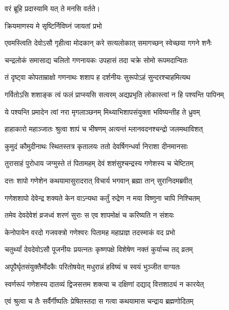 
{वरं ब्रूहि प्रदास्यामि यत् ते मनसि वर्तते।}

\onelineshloka
{क्रियमाणस्य मे सृष्टिर्निविघ्नं जायतां प्रभो}%

\twolineshloka
{एवमस्त्विति देवोऽसौ गृहीत्वा मोदकान् करे}
{सत्यलोकात् समागच्छन् स्वेच्छया गगने शनैः}%

\twolineshloka
{चन्द्रलोकं समासाद्य चलितो गणनायकः}
{उपहासं तदा चक्रे सोमो रूपमदान्वितः}%

\twolineshloka
{तं दृष्ट्वा कोपताम्राक्षो गणनाथः शशाप ह}
{दर्शनीयः सुरूपोऽहं सुन्दरश्चाहमित्यथ}%

\twolineshloka
{गर्वितोऽसि शशाङ्क त्वं फलं प्राप्स्यसि सत्वरम्}
{अद्यप्रभृति लोकास्त्वां न हि पश्यन्ति पापिनम्}%

\twolineshloka
{ये पश्यन्ति प्रमादेन त्वां नरा मृगलाञ्छनम्}
{मिथ्याभिशापसंयुक्ता भविष्यन्तीह ते ध्रुवम्}%

\twolineshloka
{हाहाकारो महाञ्जातः श्रुत्वा शापं च भीषणम्}
{अत्यन्तं म्लानवदनश्चन्द्रो जलमथाविशत्}%

\twolineshloka
{कुमुदं कौमुदीनाथः स्थितस्तत्र कृतालयः}
{ततो देवर्षिगन्धर्वा निराशा दीनमानसाः}%

\twolineshloka
{तुरासाहं पुरोधाय जग्मुस्ते तं पितामहम्}
{देवं शशंसुश्चन्द्रस्य गणेशस्य च चेष्टितम्}%

\twolineshloka
{दत्तः शापो गणेशेन कथयामासुरादरात्}
{विचार्य भगवान् ब्रह्मा तान् सुरानिदमब्रवीत्}%

\twolineshloka
{गणेशशापो देवेन्द्र शक्यते केन वाऽन्यथा}
{कर्तुं रुद्रेण न मया विष्णुना चापि निश्चितम्}%

\twolineshloka
{तमेव देवदेवेशं व्रजध्वं शरणं सुराः}
{स एव शापमोक्षं च करिष्यति न संशयः}%


\twolineshloka
{केनोपायेन वरदो गजवक्त्रो गणेश्वरः}
{पितामह महाप्राज्ञ तदस्माकं वद प्रभो}%


\twolineshloka
{चतुर्थ्यां देवदेवोऽसौ पूजनीयः प्रयत्नतः}
{कृष्णपक्षे विशेषेण नक्तं कुर्याच्च तद् व्रतम्}%

\twolineshloka
{अपूपैर्घृतसंयुक्तैर्मोदकैः परितोषयेत्}
{मधुरान्नं हविष्यं च स्वयं भुञ्जीत वाग्यतः}%

\twolineshloka
{स्वर्णरूपं गणेशस्य दातव्यं द्विजसत्तम}
{शक्त्या च दक्षिणां दद्याद् वित्तशाठ्यं न कारयेत्}%

\twolineshloka
{एवं श्रुत्वा च तैः सर्वैर्गीष्पतिः प्रेषितस्तदा}
{स गत्वा कथयामास चन्द्राय ब्रह्मणोदितम्}%

